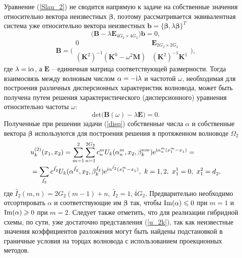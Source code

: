 \documentclass[press]{vestnik}
\begin{document}
Уравнение (\ref{Slau_2}) не сводится напрямую к задаче на собственные значения относительно вектора неизвестных $\bm{\beta}$, поэтому рассматривается эквивалентная система уже относительно вектора неизвестных $\bm{b} = \{ \bm{\beta},\lambda \bm{\beta} \}^{T}$
$$
\big( \bm{B} - \lambda \bm{E}_{4G_{2} \times 4G_{2}}^{} \big) \bm{b} = 0,
$$
$$
{\bm{B}}=
\Bigg(
\begin{matrix}
	0 								& \bm{E}_{2G_{2} \times 2G_{2}}^{}  \\
	(\bm{K}^{2})^{-1} (\bm{K}^{0} - \omega^{2} \bm{M}) & (\bm{K}^{2})^{-1} \bm{K}^{1}
\end{matrix}
\Bigg),
$$
где $\lambda = {\rm{i}} \alpha$, а $\bm{E}$ -- единичная матрица соответствующей размерности. Тогда взаимосвязь между волновым числом $\alpha=- \rm{i} \lambda$ и частотой $\omega$, необходимая для построения различных дисперсионных характеристик волновода, может быть получена путем решения характеристического (дисперсионного) уравнения относительно частоты $\omega$:
\begin{equation} \label{disp}
\text{det} \big( \bm{B}(\omega) - \lambda \bm{E} \big) = 0.
\end{equation}
Полученные при решении задачи (\ref{disp}) собственные числа $\alpha$ и собственные вектора $\bm{\beta}$ используются для построения решения в протяженном волноводе $\Omega_{2}$
\begin{equation} \label{u_2k}
	\begin{split}
		&u_{k}^{(2)}(x_1,x_2) = \sum_{m=1}^{2}\sum_{n=1}^{2G_2} c_{n}^{m} U_{k}(\alpha_{n}^{m},x_2,\beta_{k}^{nm}) \mathrm{e}^{ {\rm{i}} \alpha_{n}^{m} (x_{1}^{m}-x_{1}^{}) } = \\
		&= \sum_{\tilde{I_{2}}} c^{\tilde{I_{2}}} U_{k}(\alpha^{\tilde{I_{2}}},x_2,\beta_{k}^{\tilde{I_{2}}}) \mathrm{e}^{ {\rm{i}} \alpha_{}^{\tilde{I_{2}}} (x_{1}^{m}-x_{1}^{})},\ k=1,2, \ x_{1}^{1} = 0,\ x_{1}^{2} = d_{2}^{},
	\end{split}
\end{equation}
где $\tilde{I_{2}}(m,n)=2G_{2}(m-1)+n,\ \tilde{I_{2}}=\overline{1,4G_{2}}$. Предварительно необходимо отсортировать $\alpha$ и соответствующие им $\bm{\beta}$ так, чтобы $\rm{Im}(\alpha) \leqslant 0$ при $m=1$ и  $\rm{Im}(\alpha) \geqslant 0$ при $m=2$. Следует также отметить, что для реализации гибридной схемы, по сути, уже достаточно представления (\ref{u_2k}), так как неизвестные значения коэффициентов разложения могут быть найдены подстановкой в граничные условия на торцах волновода с использованием проекционных методов.
\end{document}
